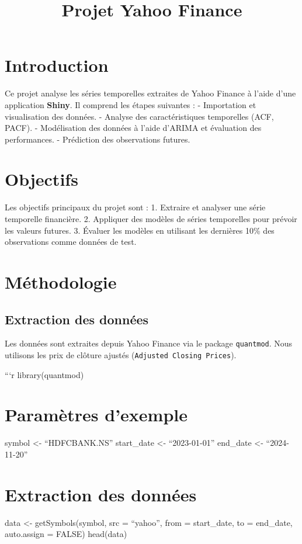 \documentclass[
]{article}
\title{Projet Yahoo Finance}
\author{}
\date{\vspace{-2.5em}}
\begin{document}
\maketitle

\section{Introduction}\label{introduction}

Ce projet analyse les séries temporelles extraites de Yahoo Finance à
l'aide d'une application \textbf{Shiny}. Il comprend les étapes
suivantes : - Importation et visualisation des données. - Analyse des
caractéristiques temporelles (ACF, PACF). - Modélisation des données à
l'aide d'ARIMA et évaluation des performances. - Prédiction des
observations futures.

\section{Objectifs}\label{objectifs}

Les objectifs principaux du projet sont : 1. Extraire et analyser une
série temporelle financière. 2. Appliquer des modèles de séries
temporelles pour prévoir les valeurs futures. 3. Évaluer les modèles en
utilisant les dernières 10\% des observations comme données de test.

\section{Méthodologie}\label{muxe9thodologie}

\subsection{Extraction des données}\label{extraction-des-donnuxe9es}

Les données sont extraites depuis Yahoo Finance via le package
\texttt{quantmod}. Nous utilisons les prix de clôture ajustés
(\texttt{Adjusted\ Closing\ Prices}).

```r library(quantmod)

\section{Paramètres d'exemple}\label{paramuxe8tres-dexemple}

symbol \textless- ``HDFCBANK.NS'' start\_date \textless- ``2023-01-01''
end\_date \textless- ``2024-11-20''

\section{Extraction des données}\label{extraction-des-donnuxe9es-1}

data \textless- getSymbols(symbol, src = ``yahoo'', from = start\_date,
to = end\_date, auto.assign = FALSE) head(data)
\end{document}
